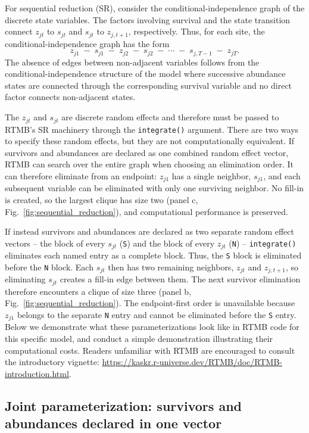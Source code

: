 \documentclass[11pt]{article}
\begin{document}
For sequential reduction (SR), consider the conditional-independence graph of
the discrete state variables. The factors involving survival and the
state transition connect $z_{jt}$ to $s_{jt}$ and $s_{jt}$ to
$z_{j,t+1}$, respectively. Thus, for each site, the conditional-independence graph has the form
\[
z_{j1} \;-\; s_{j1} \;-\; z_{j2} \;-\; s_{j2} \;-\; \cdots
\;-\; s_{j,T-1} \;-\; z_{jT}.
\]
The absence of edges between non-adjacent variables follows from the
conditional-independence structure of the model where successive abundance
states are connected through the corresponding survival variable and no
direct factor connects non-adjacent states.

The $z_{jt}$ and $s_{jt}$ are discrete random effects and therefore must be
passed to RTMB's SR machinery through the \texttt{integrate()} argument.
There are two ways to specify these random effects, but they are not computationally
equivalent. If survivors and abundances are declared as one combined random
effect vector, RTMB can search over the entire graph when choosing an elimination
order. It can therefore eliminate from an endpoint: $z_{j1}$ has a single
neighbor, $s_{j1}$, and each subsequent variable can be eliminated with
only one surviving neighbor. No fill-in is created, so the largest clique
has size two (panel c, Fig.~\ref{fig:sequential_reduction}), and computational performance 
is preserved.

If instead survivors and abundances are declared as two separate random
effect vectors -- the block of every $s_{jt}$ (\texttt{S}) and the block of every
$z_{jt}$ (\texttt{N}) -- \texttt{integrate()} eliminates each named entry as
a complete block. Thus, the \texttt{S} block is eliminated before the
\texttt{N} block. Each $s_{jt}$ then has two remaining neighbors, $z_{jt}$
and $z_{j,t+1}$, so eliminating $s_{jt}$ creates a fill-in edge between
them. The next survivor elimination therefore encounters a clique of size
three (panel b, Fig.~\ref{fig:sequential_reduction}). The endpoint-first
order is unavailable because $z_{j1}$ belongs to the separate \texttt{N}
entry and cannot be eliminated before the \texttt{S} entry. Below we demonstrate 
what these parameterizations look like in RTMB code for this specific model, 
and conduct a simple demonstration illustrating their computational costs. Readers 
unfamiliar with RTMB are encouraged to consult the introductory vignette:
\url{https://kaskr.r-universe.dev/RTMB/doc/RTMB-introduction.html}.

\subsection{Joint parameterization: survivors and abundances declared in one vector}
\end{document}
